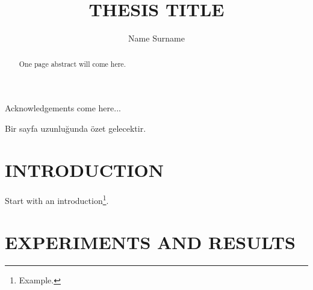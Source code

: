\documentclass[a4paper,onesided,12pt]{report}
\title{THESIS TITLE}
\author{Name Surname}
\begin{document}
\makemstitle %
\makeapprovalpage
\begin{acknowledgements}
Acknowledgements come here...
\end{acknowledgements}
\begin{abstract}
One page abstract will come here.  
\end{abstract}
\begin{ozet}
Bir sayfa uzunluğunda özet gelecektir.
\end{ozet}
\tableofcontents
\listoffigures
\listoftables
\begin{symbols}
%

\sym{}{}
\sym{ }{}

\end{symbols}

\begin{abbreviations}
\end{abbreviations}


\chapter{INTRODUCTION}
\label{chapter:introduction}
Start with an introduction\footnote{Example.}.

\lipsum[1]

\lipsum[2]

\lipsum[3]

\lipsum[4]

\lipsum[5]

\lipsum[6]

\lipsum[7]

\lipsum[8]

%
\chapter{EXPERIMENTS AND RESULTS}
\label{chapter:experiments-and-results}
\end{document}
